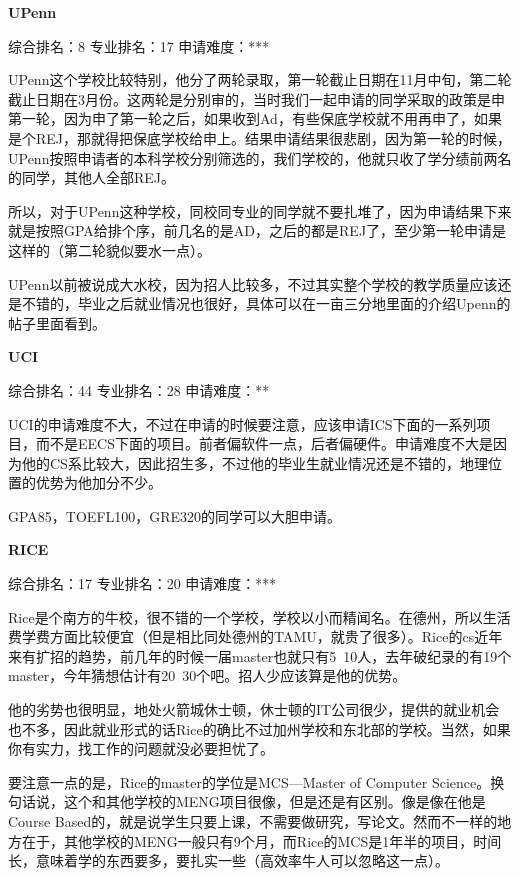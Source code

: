 \textbf{UPenn}\par
综合排名：8 专业排名：17 申请难度：*** \par

UPenn这个学校比较特别，他分了两轮录取，第一轮截止日期在11月中旬，第二轮截止日期在3月份。这两轮是分别审的，当时我们一起申请的同学采取的政策是申第一轮，因为申了第一轮之后，如果收到Ad，有些保底学校就不用再申了，如果是个REJ，那就得把保底学校给申上。结果申请结果很悲剧，因为第一轮的时候，UPenn按照申请者的本科学校分别筛选的，我们学校的，他就只收了学分绩前两名的同学，其他人全部REJ。\par

所以，对于UPenn这种学校，同校同专业的同学就不要扎堆了，因为申请结果下来就是按照GPA给排个序，前几名的是AD，之后的都是REJ了，至少第一轮申请是这样的（第二轮貌似要水一点）。\par

UPenn以前被说成大水校，因为招人比较多，不过其实整个学校的教学质量应该还是不错的，毕业之后就业情况也很好，具体可以在一亩三分地里面的介绍Upenn的帖子里面看到。\par

\textbf{UCI}\par
综合排名：44 专业排名：28 申请难度：** \par

UCI的申请难度不大，不过在申请的时候要注意，应该申请ICS下面的一系列项目，而不是EECS下面的项目。前者偏软件一点，后者偏硬件。申请难度不大是因为他的CS系比较大，因此招生多，不过他的毕业生就业情况还是不错的，地理位置的优势为他加分不少。\par

GPA85，TOEFL100，GRE320的同学可以大胆申请。\par

\textbf{RICE}\par
综合排名：17 专业排名：20 申请难度：***\par

Rice是个南方的牛校，很不错的一个学校，学校以小而精闻名。在德州，所以生活费学费方面比较便宜（但是相比同处德州的TAMU，就贵了很多）。Rice的cs近年来有扩招的趋势，前几年的时候一届master也就只有5~10人，去年破纪录的有19个master，今年猜想估计有20~30个吧。招人少应该算是他的优势。\par

他的劣势也很明显，地处火箭城休士顿，休士顿的IT公司很少，提供的就业机会也不多，因此就业形式的话Rice的确比不过加州学校和东北部的学校。当然，如果你有实力，找工作的问题就没必要担忧了。\par

要注意一点的是，Rice的master的学位是MCS—Master of Computer Science。换句话说，这个和其他学校的MENG项目很像，但是还是有区别。像是像在他是Course Based的，就是说学生只要上课，不需要做研究，写论文。然而不一样的地方在于，其他学校的MENG一般只有9个月，而Rice的MCS是1年半的项目，时间长，意味着学的东西要多，要扎实一些（高效率牛人可以忽略这一点）。\par

